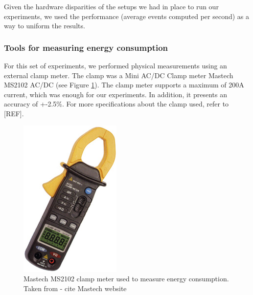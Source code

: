 Given the hardware disparities of the setups we had in place to run our experiments, we used the performance (average events computed per second) as a way to uniform the results.

\subsubsection*{Tools for measuring energy consumption}
For this set of experiments, we performed physical measurements using an external clamp meter. The clamp was a Mini AC/DC Clamp meter
Mastech MS2102 AC/DC (see Figure \ref{fig:clamp}). The clamp meter supports a maximum of 200A current, which was enough for our experiments. In addition, it presents an accuracy of +-2.5\%. For more specifications about the clamp used, refer to [REF].

\begin{figure}[]
  \centering
    \includegraphics[scale=2.5]{"img/clamp"}
    \caption{Mastech MS2102 clamp meter used to measure energy consumption. Taken from \cite{} - cite Mastech website}
    \label{fig:clamp}
\end{figure}


